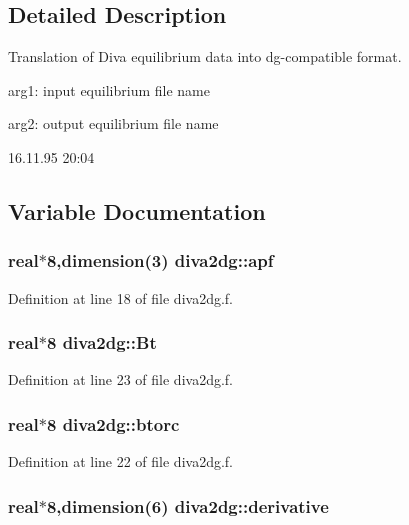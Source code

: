 \subsection{Detailed Description}
Translation of Diva equilibrium data into dg-compatible format. 

arg1: input equilibrium file name

arg2: output equilibrium file name

\begin{Desc}
\item[Version:]16.11.95 20:04 \end{Desc}


\subsection{Variable Documentation}
\hypertarget{namespacediva2dg_4af07d7599c2950bdf3884c213a9dc0e}{
\subsubsection[apf]{\setlength{\rightskip}{0pt plus 5cm}real$\ast$8,dimension(3) {\bf diva2dg::apf}}}
\label{namespacediva2dg_4af07d7599c2950bdf3884c213a9dc0e}




Definition at line 18 of file diva2dg.f.\hypertarget{namespacediva2dg_d338316587924c2d6f35996f556aad88}{
\subsubsection[Bt]{\setlength{\rightskip}{0pt plus 5cm}real$\ast$8 {\bf diva2dg::Bt}}}
\label{namespacediva2dg_d338316587924c2d6f35996f556aad88}




Definition at line 23 of file diva2dg.f.\hypertarget{namespacediva2dg_9de71c8856c2b2d0a48aff84e01eb7cf}{
\subsubsection[btorc]{\setlength{\rightskip}{0pt plus 5cm}real$\ast$8 {\bf diva2dg::btorc}}}
\label{namespacediva2dg_9de71c8856c2b2d0a48aff84e01eb7cf}




Definition at line 22 of file diva2dg.f.\hypertarget{namespacediva2dg_f75800039ab67d18c3a79738e48309d0}{
\subsubsection[derivative]{\setlength{\rightskip}{0pt plus 5cm}real$\ast$8,dimension(6) {\bf diva2dg::derivative}}}
\label{namespacediva2dg_f75800039ab67d18c3a79738e48309d0}




